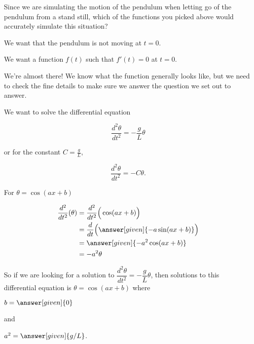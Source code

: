 \documentclass[handout,nooutcomes]{ximera}
\begin{document}
\begin{example}
\begin{explanation}
\begin{question}
Since we are simulating the motion of the pendulum when letting go of the pendulum from
a stand still, which of the functions you picked above would accurately simulate this situation?
\begin{selectAll}
\end{selectAll}
\begin{hint}
We want that the pendulum is not moving at $t=0$.
\end{hint}
\begin{hint}
We want a function $f(t)$ such that $f'(t) = 0$ at $t=0$.
\end{hint}
\end{question}

We're almost there! We know what the function generally looks like, but we
need to check the fine details to make sure we answer the question we set out to answer.

We want to solve the differential equation

\[
\dfrac{d^2 \theta}{d t^2}  = -\dfrac{g}{L} \theta
\]

or for the constant $C=\frac{g}{L}$,

\[
\dfrac{d^2 \theta}{d t^2}  = -C\theta.
\]

For $\theta = \cos(ax+b)$

\begin{align*}
    \dfrac{d^2}{d t^2}(\theta) &= \dfrac{d^2}{d t^2}\Big(\cos(a x + b)\Big)\\
    &= \dfrac{d}{d t} \Big( \answer[given]{- a \sin(a x+b)}\Big)\\
    &= \answer[given]{-a^2 \cos(a x+b)}\\
    &= -a^2 \theta 
\end{align*}

\begin{question}
So if we are looking for a solution to $\dfrac{d^2 \theta}{d t^2}  = -\dfrac{g}{L} \theta$,
then solutions to this differential equation is $\theta = \cos(ax+b)$ where

\begin{prompt}
$b = \answer[given]{0}$
\end{prompt}

and 

\begin{prompt}
$a^2 = \answer[given]{g/L}$.
\end{prompt}


\end{question}
\end{explanation}
\end{example}
\end{document}
